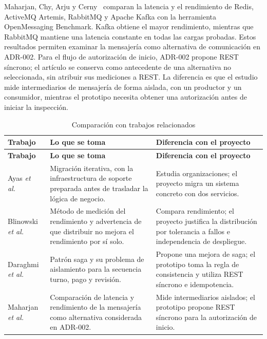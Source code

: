 \documentclass[11pt,a4paper]{article}
\begin{document}
	Maharjan, Chy, Arju y Cerny~\cite{maharjan2023benchmarking} comparan la latencia y el rendimiento de Redis, ActiveMQ Artemis, RabbitMQ y Apache Kafka con la herramienta OpenMessaging Benchmark. Kafka obtiene el mayor rendimiento, mientras que RabbitMQ mantiene una latencia constante en todas las cargas probadas. Estos resultados permiten examinar la mensajería como alternativa de comunicación en ADR-002. Para el flujo de autorización de inicio, ADR-002 propone REST síncrono; el artículo se conserva como antecedente de una alternativa no seleccionada, sin atribuir sus mediciones a REST. La diferencia es que el estudio mide intermediarios de mensajería de forma aislada, con un productor y un consumidor, mientras el prototipo necesita obtener una autorización antes de iniciar la inspección.
	
	\begin{xltabular}{\textwidth}{L{3cm}XX}
		\caption{Comparación con trabajos relacionados}\label{tab:relacionados}\\
		\toprule
		\textbf{Trabajo} & \textbf{Lo que se toma} & \textbf{Diferencia con el proyecto} \\
		\midrule
		\endfirsthead
		\toprule
		\textbf{Trabajo} & \textbf{Lo que se toma} & \textbf{Diferencia con el proyecto} \\
		\midrule
		\endhead
		\bottomrule
		\endfoot
		Ayas \emph{et al.}~\cite{ayas2023migration} & Migración iterativa, con la infraestructura de soporte preparada antes de trasladar la lógica de negocio. & Estudia organizaciones; el proyecto migra un sistema concreto con dos servicios. \\
		Blinowski \emph{et al.}~\cite{blinowski2022monolithic} & Método de medición del rendimiento y advertencia de que distribuir no mejora el rendimiento por sí solo. & Compara rendimiento; el proyecto justifica la distribución por tolerancia a fallos e independencia de despliegue. \\
		Daraghmi \emph{et al.}~\cite{daraghmi2022saga} & Patrón saga y su problema de aislamiento para la secuencia turno, pago y revisión. & Propone una mejora de saga; el prototipo toma la regla de consistencia y utiliza REST síncrono e idempotencia. \\
		Maharjan \emph{et al.}~\cite{maharjan2023benchmarking} & Comparación de latencia y rendimiento de la mensajería como alternativa considerada en ADR-002. & Mide intermediarios aislados; el prototipo propone REST síncrono para la autorización de inicio. \\
	\end{xltabular}
	
\end{document}
